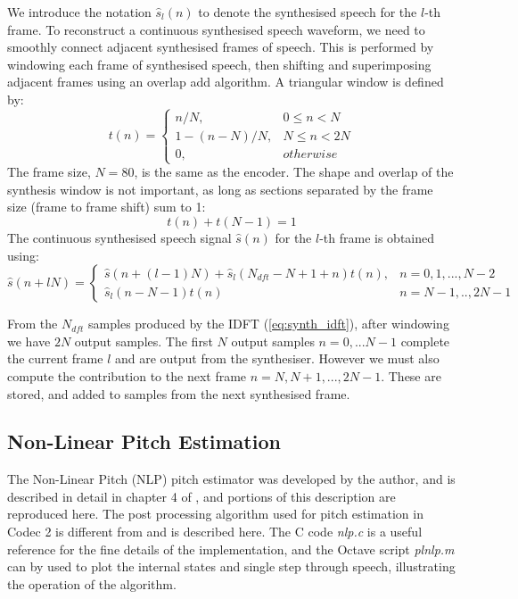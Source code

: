 \documentclass{article}
\begin{document}
We introduce the notation $\hat{s}_l(n)$ to denote the synthesised speech for the $l$-th frame. To reconstruct a continuous synthesised speech waveform, we need to smoothly connect adjacent synthesised frames of speech. This is performed by windowing each frame of synthesised speech, then shifting and superimposing adjacent frames using an overlap add algorithm. A triangular window is defined by:
\begin{equation}
t(n) = \begin{cases}
          n/N,         & 0 \le n < N  \\
          1 - (n-N)/N, & N \le n < 2N \\ 
          0,           & otherwise
       \end{cases}
\end{equation}
The frame size, $N=80$, is the same as the encoder. The shape and overlap of the synthesis window is not important, as long as sections separated by the frame size (frame to frame shift) sum to 1:
\begin{equation}
t(n) + t(N-1) = 1
\end{equation}
The continuous synthesised speech signal $\hat{s}(n)$ for the $l$-th frame is obtained using:
\begin{equation}
\hat{s}(n+lN) = \begin{cases}
                    \hat{s}(n+(l-1)N) + \hat{s}_l(N_{dft}-N+1+n)t(n), & n=0,1,...,N-2 \\ 
		            \hat{s}_l(n - N - 1)t(n)                                    & n=N-1,..,2N-1
                  \end{cases}
\end{equation}

From the $N_{dft}$ samples produced by the IDFT (\ref{eq:synth_idft}), after windowing we have $2N$ output samples. The first $N$ output samples $n=0,...N-1$ complete the current frame $l$ and are output from the synthesiser.  However we must also compute the contribution to the next frame $n = N,N+1,...,2N-1$.  These are stored, and added to samples from the next synthesised frame.

\subsection{Non-Linear Pitch Estimation}

The Non-Linear Pitch (NLP) pitch estimator was developed by the author, and is described in detail in chapter 4 of \cite{rowe1997techniques}, and portions of this description are reproduced here.  The post processing algorithm used for pitch estimation in Codec 2 is different from \cite{rowe1997techniques} and is described here.  The C code \emph{nlp.c} is a useful reference for the fine details of the implementation, and the Octave script \emph{plnlp.m} can by used to plot the internal states and single step through speech, illustrating the operation of the algorithm.
\end{document}
